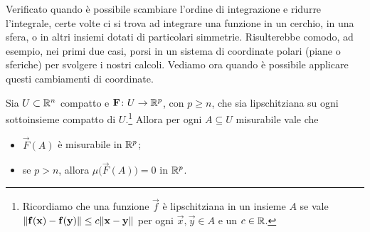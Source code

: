 Verificato quando è possibile scambiare l'ordine di integrazione e ridurre l'integrale, certe volte ci si trova ad integrare una funzione in un cerchio, in una sfera, o in altri insiemi dotati di particolari simmetrie.
Risulterebbe comodo, ad esempio, nei primi due casi, porsi in un sistema di coordinate polari (piane o sferiche) per svolgere i nostri calcoli.
Vediamo ora quando è possibile applicare questi cambiamenti di coordinate.
\begin{teorema}
	Sia $U\subset\mathbb{R}^n$ compatto e $\mathbf{F}\colon U\to\mathbb{R}^p$, con $p\geq n$, che sia lipschitziana su ogni sottoinsieme compatto di $U$.\footnote{Ricordiamo che una funzione $\vec f$ è lipschitziana in un insieme $A$ se vale $\lVert\mathbf{f}(\mathbf{x})-\mathbf{f}(\mathbf{y})\rVert\leq c\lVert\mathbf{x}-\mathbf{y}\rVert$ per ogni $\vec x,\vec y\in A$ e un $c\in\mathbb{R}$.}
	Allora per ogni $A\subseteq U$ misurabile vale che
	\begin{itemize}
		\item $\vec F(A)$ è misurabile in $\mathbb{R}^p$;
		\item se $p>n$, allora $\mu\big(\vec F(A)\big)=0$ in $\mathbb{R}^p$.
	\end{itemize}
\end{teorema}


